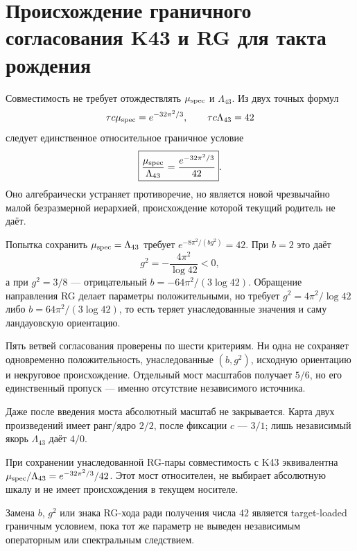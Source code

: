 \chapter{Происхождение граничного согласования K43 и RG для такта рождения}
\label{ch:v10-birth-tick-k43-rg-boundary-matching}

Совместимость не требует отождествлять $\mu_{\rm spec}$ и $\Lambda_{43}$.
Из двух точных формул
\begin{equation}
 \tau c\mu_{\rm spec}=e^{-32\pi^2/3},\qquad
 \tau c\Lambda_{43}=42
\end{equation}
следует единственное относительное граничное условие
\begin{equation}
 \boxed{\frac{\mu_{\rm spec}}{\Lambda_{43}}
 =\frac{e^{-32\pi^2/3}}{42}}.
\end{equation}
Оно алгебраически устраняет противоречие, но является новой чрезвычайно
малой безразмерной иерархией, происхождение которой текущий родитель не даёт.

Попытка сохранить $\mu_{\rm spec}=\Lambda_{43}$ требует
$e^{-8\pi^2/(bg^2)}=42$. При $b=2$ это даёт
\begin{equation}
 g^2=-\frac{4\pi^2}{\log42}<0,
\end{equation}
а при $g^2=3/8$ --- отрицательный
$b=-64\pi^2/(3\log42)$. Обращение направления RG делает параметры
положительными, но требует $g^2=4\pi^2/\log42$ либо
$b=64\pi^2/(3\log42)$, то есть теряет унаследованные значения и саму
ландауовскую ориентацию.

Пять ветвей согласования проверены по шести критериям. Ни одна не сохраняет
одновременно положительность, унаследованные $(b,g^2)$, исходную ориентацию
и некруговое происхождение. Отдельный мост масштабов получает $5/6$, но его
единственный пропуск --- именно отсутствие независимого источника.

Даже после введения моста абсолютный масштаб не закрывается. Карта двух
произведений имеет ранг/ядро $2/2$, после фиксации $c$ --- $3/1$; лишь
независимый якорь $\Lambda_{43}$ даёт $4/0$.

\begin{theorem}
При сохранении унаследованной RG-пары совместимость с K43 эквивалентна
$\mu_{\rm spec}/\Lambda_{43}=e^{-32\pi^2/3}/42$. Этот мост относителен,
не выбирает абсолютную шкалу и не имеет происхождения в текущем носителе.
\end{theorem}

\begin{nogocriterion}
Замена $b$, $g^2$ или знака RG-хода ради получения числа $42$ является
target-loaded граничным условием, пока тот же параметр не выведен
независимым операторным или спектральным следствием.
\end{nogocriterion}

